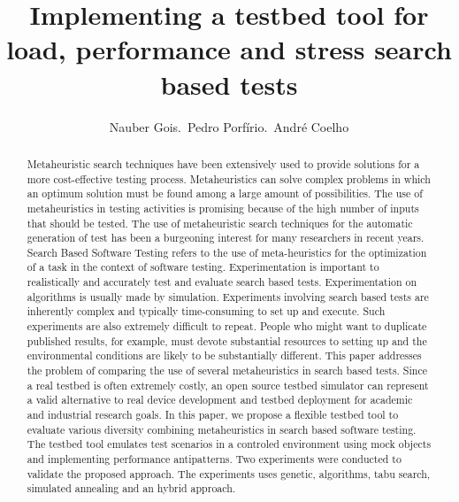 \documentclass[times]{stvrauth}
\begin{document}

\title{Implementing a testbed tool for load, performance and stress search based tests}

\author{Nauber Gois.~Pedro Porfírio.~André Coelho\corrauth}

\address{Universidade de Fortaleza, UNIFOR, Southern Gate, Chichester,
West Sussex, PO19~8SQ, UK}


\begin{abstract}
Metaheuristic search techniques have been extensively used to provide solutions for a more cost-effective testing process. Metaheuristics can solve complex problems in which an optimum solution must be found among a large amount of possibilities. The use of metaheuristics in testing activities is promising because of the high number of inputs that should be
tested. The use of metaheuristic search techniques for the automatic generation
of test  has been a burgeoning interest for many researchers in recent years. Search Based Software Testing refers to the use of meta-heuristics for the optimization of a task in the context of
software testing. Experimentation is important to realistically and accurately
test and evaluate search based tests. Experimentation
on algorithms is usually made by simulation. Experiments involving search based tests are inherently complex and typically time-consuming to set up and
execute. Such experiments are also extremely difficult to
repeat. People who might want to duplicate published results, for example, must devote substantial resources to setting up and the environmental conditions are likely to be substantially different. This paper addresses the problem of comparing the use of several metaheuristics in search based tests. Since a real testbed is often extremely costly, an open source testbed simulator can represent a valid alternative to real device development and testbed deployment for academic and industrial research goals. In this paper, we propose a flexible testbed tool to evaluate various diversity combining metaheuristics in search based software testing. The testbed tool emulates test scenarios in a controled environment using mock objects and implementing performance antipatterns. Two experiments were conducted to validate the proposed approach. The experiments uses genetic, algorithms, tabu search, simulated annealing and an hybrid approach.
\end{abstract}
\end{document}
